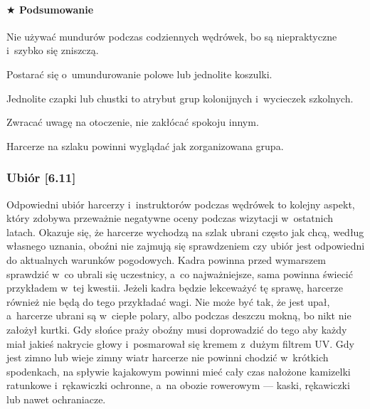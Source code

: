\documentclass[a5paper,10pt,titlepage,twoside]{article}
\newcommand*{\thecheckbox}{\hss$\Box$} %
\newenvironment*{checklist}
{\list{}{%
\renewcommand*{\makelabel}[1]{\thecheckbox}}}
{\endlist}
\begin{document}
\paragraph{$\bigstar$ Podsumowanie}
\begin{checklist}
\item Nie używać mundurów podczas codziennych wędrówek, bo są niepraktyczne i~szybko się zniszczą.
\item Postarać się o~umundurowanie polowe lub jednolite koszulki.
\item Jednolite czapki lub chustki to atrybut grup kolonijnych i~wycieczek szkolnych.
\item Zwracać uwagę na otoczenie, nie zakłócać spokoju innym.
\item Harcerze na szlaku powinni wyglądać jak zorganizowana grupa.
\end{checklist}
\subsubsection{Ubiór [6.11]}
Odpowiedni ubiór harcerzy i~instruktorów podczas wędrówek to kolejny aspekt, który zdobywa przeważnie negatywne oceny podczas wizytacji w~ostatnich latach. Okazuje się, że harcerze wychodzą na szlak ubrani często jak chcą, według własnego uznania, oboźni nie zajmują się sprawdzeniem czy ubiór jest odpowiedni do aktualnych warunków pogodowych. Kadra powinna przed wymarszem sprawdzić w~co ubrali się uczestnicy, a~co najważniejsze, sama powinna świecić przykładem w~tej kwestii. Jeżeli kadra będzie lekceważyć tę sprawę, harcerze również nie będą do tego przykładać wagi. Nie może być tak, że jest upał, a~harcerze ubrani są w~ciepłe polary, albo podczas deszczu mokną, bo nikt nie założył kurtki. Gdy słońce praży oboźny musi doprowadzić do tego aby każdy miał jakieś nakrycie głowy i~posmarował się kremem z~dużym filtrem UV. Gdy jest zimno lub wieje zimny wiatr harcerze nie powinni chodzić w~krótkich spodenkach, na spływie kajakowym powinni mieć cały czas nałożone kamizelki ratunkowe i~rękawiczki ochronne, a~na obozie rowerowym --- kaski, rękawiczki lub nawet ochraniacze.
\end{document}
